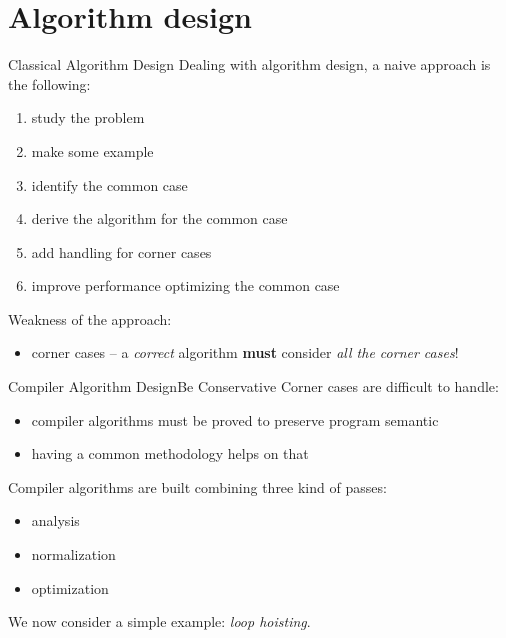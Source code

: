 \documentclass[10pt,mathserif]{beamer}
\begin{document}
\section{Algorithm design}
\begin{frame}{Classical Algorithm Design}
	Dealing with algorithm design, a naive approach is the following:
	\begin{enumerate}
		\item study the problem
		\item make some example
		\item identify the \alert{common case}
		\item derive the algorithm for the common case
		\item add handling for \alert{corner cases}
		\item improve performance \alert{optimizing the common case}
	\end{enumerate}
	
	\vfill
	Weakness of the approach:
	\begin{itemize}
		\item \alert{corner cases} -- a \emph{correct} algorithm \textbf{must} consider \emph{all the corner cases}!
	\end{itemize}
\end{frame}

\begin{frame}{Compiler Algorithm Design}{Be Conservative}
	Corner cases are difficult to handle:
	
	\begin{itemize}
		\item compiler algorithms must be \alert{proved} to preserve program semantic
		\item having a common methodology helps on that
	\end{itemize}
	\vfill
	Compiler algorithms are built combining three kind of \alert{passes}:
	
	\begin{itemize}
		\item analysis
		\item normalization
		\item optimization
	\end{itemize}
	
	\vfill
	We now consider a simple example: \emph{loop hoisting}.
\end{frame}
\end{document}
